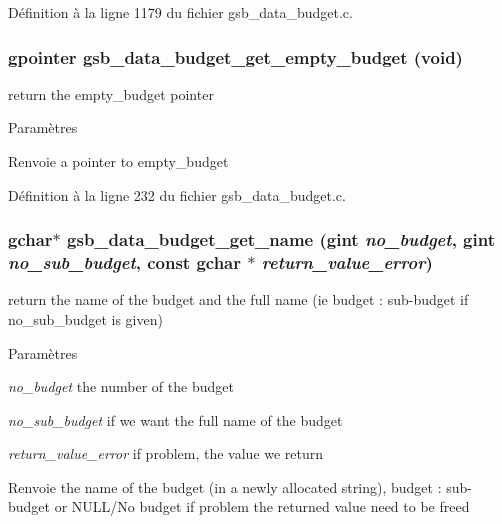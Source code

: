 Définition à la ligne 1179 du fichier gsb\_\-data\_\-budget.c.

\subsubsection[{gsb\_\-data\_\-budget\_\-get\_\-empty\_\-budget}]{\setlength{\rightskip}{0pt plus 5cm}gpointer gsb\_\-data\_\-budget\_\-get\_\-empty\_\-budget (void)}\label{gsb__data__budget_8h_a762dd3d7423ddd596a1a827b0a09774b}
return the empty\_\-budget pointer


\begin{DoxyParams}{Paramètres}
\item[{\em }]\end{DoxyParams}
\begin{DoxyReturn}{Renvoie}
a pointer to empty\_\-budget 
\end{DoxyReturn}


Définition à la ligne 232 du fichier gsb\_\-data\_\-budget.c.

\subsubsection[{gsb\_\-data\_\-budget\_\-get\_\-name}]{\setlength{\rightskip}{0pt plus 5cm}gchar$\ast$ gsb\_\-data\_\-budget\_\-get\_\-name (gint {\em no\_\-budget}, \/  gint {\em no\_\-sub\_\-budget}, \/  const gchar $\ast$ {\em return\_\-value\_\-error})}\label{gsb__data__budget_8h_af857141b1d34674997a047500fd76060}
return the name of the budget and the full name (ie budget : sub-\/budget if no\_\-sub\_\-budget is given)


\begin{DoxyParams}{Paramètres}
\item[{\em no\_\-budget}]the number of the budget \item[{\em no\_\-sub\_\-budget}]if we want the full name of the budget \item[{\em return\_\-value\_\-error}]if problem, the value we return\end{DoxyParams}
\begin{DoxyReturn}{Renvoie}
the name of the budget (in a newly allocated string), budget : sub-\/budget or NULL/No budget if problem the returned value need to be freed 
\end{DoxyReturn}


